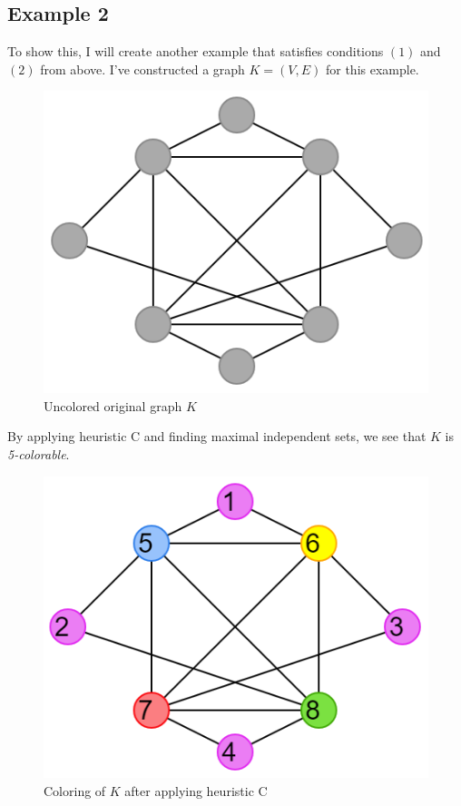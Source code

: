 \documentclass{article}
\theoremstyle{definition}
\begin{document}
\subsection*{Example 2}
To show this, I will create another example that satisfies conditions \((1)\) and \((2)\) from above. I've constructed a graph \(K = (V,E)\) for this example.

\begin{figure}[H]
\centering
\includegraphics[scale=0.38]{images/mis-1.png}
\caption{Uncolored original graph \(K\)}
\end{figure}

By applying heuristic C and finding maximal independent sets, we see that \(K\) is \emph{5-colorable}.

\begin{figure}[H]
\centering
\includegraphics[scale=0.38]{images/mis-2.png}
\caption{Coloring of \(K\) after applying heuristic C}
\end{figure}
\end{document}
